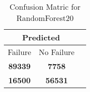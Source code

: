 \begin{table}[] 
\caption{Confusion Matric for RandomForest20} 
\label{Table: Prediction Accuracy-DMDRandomForest20OnlySunEKF-ignoreReflectionEKF-top2-Reflection} 
\centering 
\begin{tabular} 
 {@{}ccc@{}} 
\toprule 
\multicolumn{2}{c}{\textbf{Predicted}}
 \\ \midrule 
\multicolumn{1}{|c|}{Failure} & 
\multicolumn{1}{c|}{No Failure}
 \\ \midrule 
\multicolumn{1}{|c|}{\color{green}\textbf{89339}} & 
\multicolumn{1}{c|}{\color{red}\textbf{7758}}
 \\ \midrule 
\multicolumn{1}{|c|}{\color{red}\textbf{16500}} & 
\multicolumn{1}{c|}{\color{green}\textbf{56531}}
 \\ \bottomrule 
\end{tabular} 
\end{table} 
